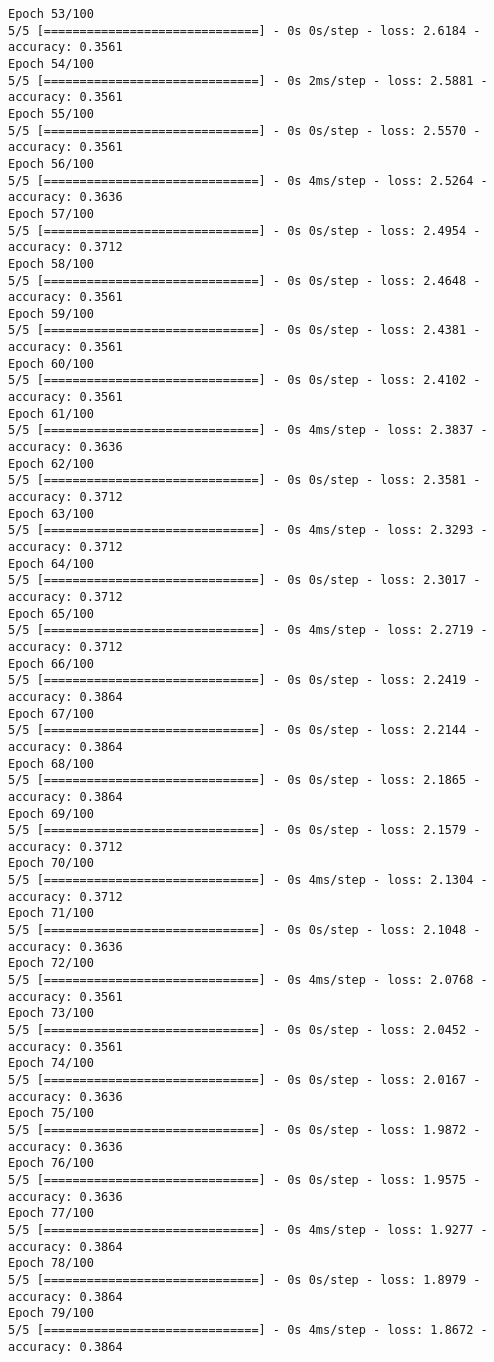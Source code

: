 \documentclass[12pt]{article}
\begin{document}
\begin{lstlisting}
Epoch 53/100
5/5 [==============================] - 0s 0s/step - loss: 2.6184 - accuracy: 0.3561
Epoch 54/100
5/5 [==============================] - 0s 2ms/step - loss: 2.5881 - accuracy: 0.3561
Epoch 55/100
5/5 [==============================] - 0s 0s/step - loss: 2.5570 - accuracy: 0.3561
Epoch 56/100
5/5 [==============================] - 0s 4ms/step - loss: 2.5264 - accuracy: 0.3636
Epoch 57/100
5/5 [==============================] - 0s 0s/step - loss: 2.4954 - accuracy: 0.3712
Epoch 58/100
5/5 [==============================] - 0s 0s/step - loss: 2.4648 - accuracy: 0.3561
Epoch 59/100
5/5 [==============================] - 0s 0s/step - loss: 2.4381 - accuracy: 0.3561
Epoch 60/100
5/5 [==============================] - 0s 0s/step - loss: 2.4102 - accuracy: 0.3561
Epoch 61/100
5/5 [==============================] - 0s 4ms/step - loss: 2.3837 - accuracy: 0.3636
Epoch 62/100
5/5 [==============================] - 0s 0s/step - loss: 2.3581 - accuracy: 0.3712
Epoch 63/100
5/5 [==============================] - 0s 4ms/step - loss: 2.3293 - accuracy: 0.3712
Epoch 64/100
5/5 [==============================] - 0s 0s/step - loss: 2.3017 - accuracy: 0.3712
Epoch 65/100
5/5 [==============================] - 0s 4ms/step - loss: 2.2719 - accuracy: 0.3712
Epoch 66/100
5/5 [==============================] - 0s 0s/step - loss: 2.2419 - accuracy: 0.3864
Epoch 67/100
5/5 [==============================] - 0s 0s/step - loss: 2.2144 - accuracy: 0.3864
Epoch 68/100
5/5 [==============================] - 0s 0s/step - loss: 2.1865 - accuracy: 0.3864
Epoch 69/100
5/5 [==============================] - 0s 0s/step - loss: 2.1579 - accuracy: 0.3712
Epoch 70/100
5/5 [==============================] - 0s 4ms/step - loss: 2.1304 - accuracy: 0.3712
Epoch 71/100
5/5 [==============================] - 0s 0s/step - loss: 2.1048 - accuracy: 0.3636
Epoch 72/100
5/5 [==============================] - 0s 4ms/step - loss: 2.0768 - accuracy: 0.3561
Epoch 73/100
5/5 [==============================] - 0s 0s/step - loss: 2.0452 - accuracy: 0.3561
Epoch 74/100
5/5 [==============================] - 0s 0s/step - loss: 2.0167 - accuracy: 0.3636
Epoch 75/100
5/5 [==============================] - 0s 0s/step - loss: 1.9872 - accuracy: 0.3636
Epoch 76/100
5/5 [==============================] - 0s 0s/step - loss: 1.9575 - accuracy: 0.3636
Epoch 77/100
5/5 [==============================] - 0s 4ms/step - loss: 1.9277 - accuracy: 0.3864
Epoch 78/100
5/5 [==============================] - 0s 0s/step - loss: 1.8979 - accuracy: 0.3864
Epoch 79/100
5/5 [==============================] - 0s 4ms/step - loss: 1.8672 - accuracy: 0.3864

\end{lstlisting}
\end{document}

